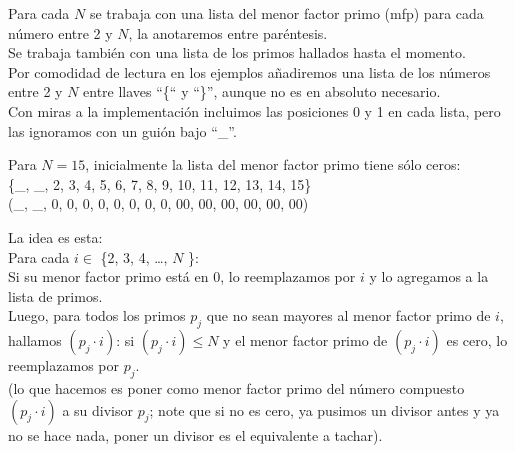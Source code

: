 Para cada $N$ se trabaja con una lista del menor factor primo (mfp) para cada número entre 2 y $N$, la anotaremos entre paréntesis. \\ 
Se trabaja también con una lista de los primos hallados hasta el momento. \\ 
Por comodidad de lectura en los ejemplos añadiremos una lista de los números entre 2 y $N$ entre llaves “\{“ y “\}”, aunque no es en absoluto necesario. \\ 
Con miras a la implementación incluimos las posiciones 0 y 1 en cada lista, pero las ignoramos con un guión bajo “\_”. \\

\begin{ejemplo}
Para $N = 15$, inicialmente la lista del menor factor primo tiene sólo ceros: \\ 
\{\_, \_, 2, 3, 4, 5, 6, 7, 8, 9, 10, 11, 12, 13, 14, 15\} \\ 
(\_, \_, 0, 0, 0, 0, 0, 0, 0, 0, 00, 00, 00, 00, 00, 00) 
\end{ejemplo}

La idea es esta:  \\ 
Para cada $i \in $ \{2, 3, 4, …, $N$ \}: \\ 
Si su menor factor primo está en 0, lo reemplazamos por $i$ y lo agregamos a la lista de primos. \\ 
Luego, para todos los primos $p_j$ que no sean mayores al menor factor primo de $i$, hallamos $(p_j \cdot i)$: si $(p_j \cdot i) \leq N$ y el menor factor primo de $(p_j \cdot i)$ es cero, lo reemplazamos por $p_j$. \\
(lo que hacemos es poner como menor factor primo del número compuesto $(p_j \cdot i)$ a su divisor $p_j$; note que si no es cero, ya pusimos un divisor antes y ya no se hace nada, poner un divisor es el equivalente a tachar). \\

